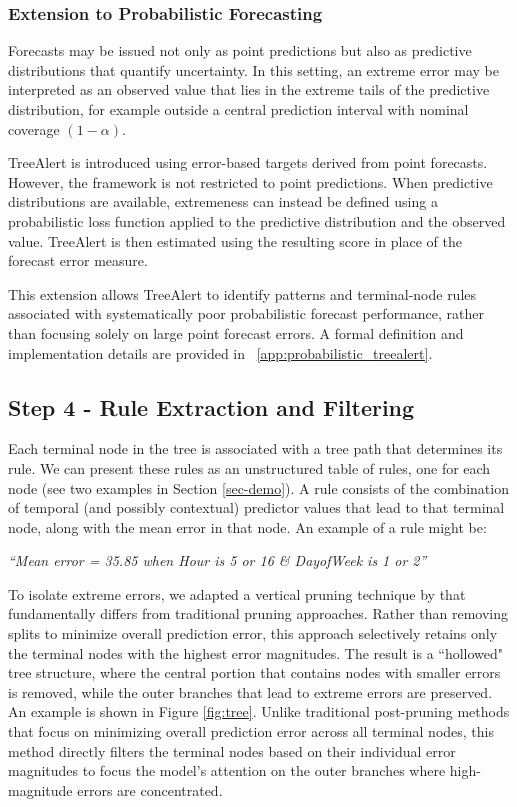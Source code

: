 \documentclass[preprint,12pt]{elsarticle}
\begin{document}
\subsubsection{Extension to Probabilistic Forecasting}

Forecasts may be issued not only as point predictions but also as predictive distributions that quantify uncertainty. In this setting, an extreme error may be interpreted as an observed value that lies in the extreme tails of the predictive distribution, for example outside a central prediction 
interval with nominal coverage $(1-\alpha)$.

TreeAlert is introduced using error-based targets derived from point forecasts. However, the framework is not restricted to point predictions. When predictive distributions are available, extremeness can instead be defined using a probabilistic loss function applied to the predictive distribution and the observed value. TreeAlert is then estimated using the resulting score in place of the forecast error measure.

This extension allows TreeAlert to identify patterns and terminal-node rules associated with systematically poor probabilistic forecast performance, rather than focusing solely on large point forecast errors. A formal definition and implementation details are provided in ~\ref{app:probabilistic_treealert}.

\subsection{Step 4 - Rule Extraction and Filtering}
\label{sec:rule-extraction}
Each terminal node in the tree is associated with a tree path that determines its rule. We can present these rules as an unstructured table of rules, one for each node (see two examples in Section \ref{sec-demo}). A rule consists of the combination of temporal (and possibly contextual) predictor values that lead to that terminal node, along with the mean error in that node. An example of a rule might be: 
\begin{center}
\textit{``Mean error = 35.85 when Hour is 5 or 16 \& DayofWeek is 1 or 2''}
\end{center}

To isolate extreme errors, we adapted a vertical pruning technique by \cite{danks2024composite} that fundamentally differs from traditional pruning approaches. Rather than removing splits to minimize overall prediction error, this approach selectively retains only the terminal nodes with the highest error magnitudes. The result is a ``hollowed" tree structure, where the central portion that contains nodes with smaller errors is removed, while the outer branches that lead to extreme errors are preserved. An example is shown in Figure \ref{fig:tree}. Unlike traditional post-pruning methods that focus on minimizing overall prediction error across all terminal nodes, this method directly filters the terminal nodes based on their individual error magnitudes to focus the model’s attention on the outer branches where high-magnitude errors are concentrated.
\end{document}
